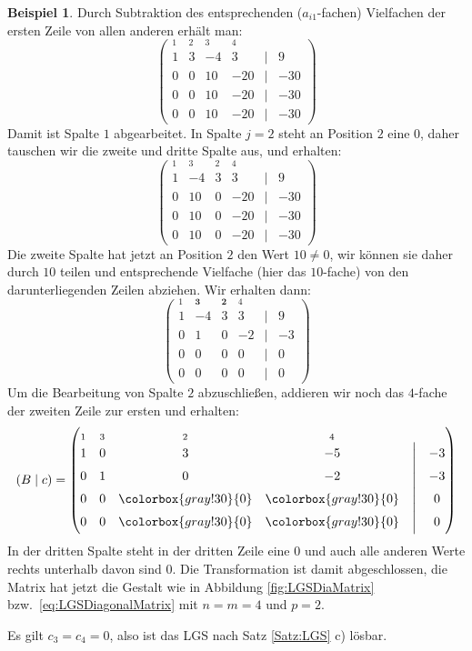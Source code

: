 \documentclass[a4paper,11pt,oneside]{article}
\theoremstyle{definition}
\newtheorem{example}{Beispiel}
\def\GB#1{\colorbox{gray!30}{#1}}
\begin{document}
\begin{example}
Durch Subtraktion des entsprechenden ($ a_{i1}$-fachen) Vielfachen der ersten Zeile von allen anderen erhält man:
$$
\begin{pmatrix}
_1&_2&_3&_4&\\
{1}&3&-4&3&\Big |& 9\\
{0}&0&10&-20&\Big |&-30\\
{0}&0&10&-20&\Big |&-30\\
{0}&0&10&-20&\Big | &-30
\end{pmatrix}
$$
Damit ist Spalte $1$ abgearbeitet. In Spalte $j=2$ steht an Position $2$ eine $0$, daher tauschen wir die zweite und dritte Spalte aus, und erhalten:
$$
\begin{pmatrix}
_1&_3&_2&_4&\\
1 &-4&3 &3&\Big |& 9\\
0 &10&0 &-20&\Big |&-30\\
0 &10&0 &-20&\Big |&-30\\
0 &10&0 &-20&\Big | &-30
\end{pmatrix}
$$
Die zweite Spalte hat jetzt an Position $2$ den Wert $10\neq0$, wir können sie daher durch $10$ teilen und entsprechende Vielfache (hier das $10$-fache) von den darunterliegenden Zeilen abziehen. Wir erhalten dann:
$$
\begin{pmatrix}
_1&_\mathbf{3}&_\mathbf{2}&_4&&\\
1&-4&3&3&\Big |&9\\
0&1&0&-2&\Big |&-3\\
0&0&0&0&\Big |&0\\
0&0&0&0&\Big |&0
\end{pmatrix}
$$
Um die Bearbeitung von Spalte $2$ abzuschließen, addieren wir noch das $4$-fache der zweiten Zeile zur ersten und erhalten:
$$
\left(B\mid c\right)=
\begin{pmatrix}
_1&_3&_2&_4&&\\
1&0&3&-5&\Big |&-3\\
0&1&0&-2&\Big | &-3\\
0&0&\GB{0}&\GB{0}&\Big |&0\\
0&0&\GB{0}&\GB{0}&\Big |&0
\end{pmatrix}
$$
In der dritten Spalte steht in der dritten Zeile eine $0$ und auch alle anderen Werte rechts unterhalb davon sind $0$. Die Transformation ist damit abgeschlossen, die Matrix hat jetzt die Gestalt wie in Abbildung \ref{fig:LGSDiaMatrix} bzw.\ \eqref{eq:LGSDiagonalMatrix} mit $n=m=4$ und $p=2$.

Es gilt $c_3=c_4=0$, also ist das LGS nach Satz \ref{Satz:LGS} c) lösbar.


\end{example}
\end{document}
